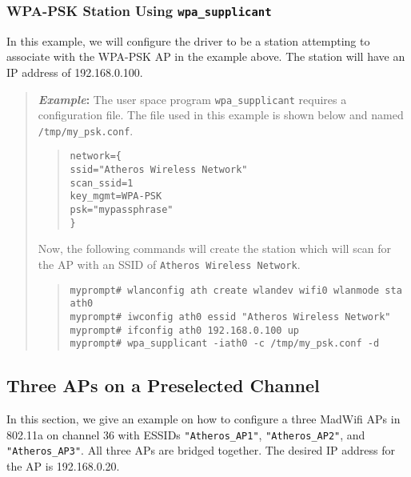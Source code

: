 \documentclass[10pt,fullpage]{article}
\newcommand{\mytt}[1]{{\texttt{#1}}}
\newcommand{\bv}{\begin{verse}}
\newcommand{\ev}{\end{verse}}
\newcommand{\cmd}[1]{{\texttt{myprompt\# #1}}}
\newenvironment{example}{\begin{quote}\textbf{\textit{Example}:}}{\end{quote}}
\begin{document}
\subsubsection{WPA-PSK Station Using \mytt{wpa\_supplicant}}
In this example, we will configure the driver to be a station
attempting to associate with the WPA-PSK AP in the example above.  The
station will have an IP address of 192.168.0.100.
\begin{example}
  The user space program \mytt{wpa\_supplicant} requires a
  configuration file.  The file used in this example is shown below
  and named \mytt{/tmp/my\_psk.conf}.
  \bv
  \mytt{network=\{}\\
  \mytt{\hspace{30pt}ssid="Atheros Wireless Network"}\\
  \mytt{\hspace{30pt}scan\_ssid=1}\\
  \mytt{\hspace{30pt}key\_mgmt=WPA-PSK}\\
  \mytt{\hspace{30pt}psk="mypassphrase"}\\
  \mytt{\}}
  \ev
  Now, the following commands will create the station which will scan
  for the AP with an SSID of \mytt{Atheros Wireless Network}.
  \bv
  \cmd{wlanconfig ath create wlandev wifi0 wlanmode sta}\\
  \mytt{ath0}\\
  \cmd{iwconfig ath0 essid "Atheros Wireless Network"}\\
  \cmd{ifconfig ath0 192.168.0.100 up}\\
  \cmd{wpa\_supplicant -iath0 -c /tmp/my\_psk.conf -d}
  \ev
\end{example}

\subsection{Three APs on a Preselected Channel}
In this section, we give an example on how to configure a three
MadWifi APs in 802.11a on channel 36 with ESSIDs
\mytt{"Atheros\_AP1"}, \mytt{"Atheros\_AP2"}, and
\mytt{"Atheros\_AP3"}. All three APs are bridged together.  The
desired IP address for the AP is 192.168.0.20.
\end{document}
